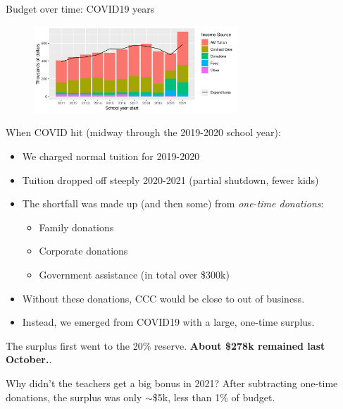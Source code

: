\documentclass[8pt]{beamer}
\begin{document}
\begin{frame}{Budget over time: COVID19 years}
\begin{figure}
\begin{center}
\includegraphics[width=3in]{budget_history_w_income_source.png}
\end{center}
\end{figure}

When COVID hit (midway through the 2019-2020 school year):
%
\begin{itemize}
%
\item We charged normal tuition for 2019-2020
\item Tuition dropped off steeply 2020-2021 (partial shutdown, fewer kids)
\item The shortfall was made up (and then some) from {\em one-time donations}:
\begin{itemize}
    \item Family donations
    \item Corporate donations
    \item Government assistance (in total over \$300k)
\end{itemize}
\item Without these donations, CCC would be close to out of business.
\item Instead, we emerged from COVID19 with a large, one-time surplus.
%
\end{itemize}
%
The surplus first went to the 20\% reserve.
\textbf{About \$278k remained last October.}.

Why didn't the teachers get a big bonus in 2021?  After subtracting one-time
donations, the surplus was only $\sim$\$5k, less than 1\% of budget.

\end{frame}


\end{document}

